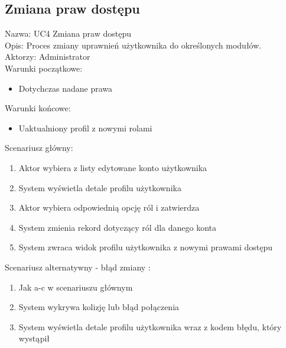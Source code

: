 \subsection{Zmiana praw dostępu}
Nazwa: UC4 Zmiana praw dostępu \\
Opis: Proces zmiany uprawnień użytkownika do określonych modułów. \\
Aktorzy: Administrator \\
Warunki początkowe:
\begin{itemize}
\item Dotychczas nadane prawa 
\end{itemize}
Warunki końcowe: 
\begin{itemize}
\item Uaktualniony profil z nowymi rolami
\end{itemize}
Scenariusz główny: 
\begin{enumerate}
\item Aktor wybiera z listy edytowane konto użytkownika
\item System wyświetla detale profilu użytkownika
\item Aktor wybiera odpowiednią opcję ról i zatwierdza
\item System zmienia rekord dotyczący ról dla danego konta
\item System zwraca widok profilu użytkownika z nowymi prawami dostępu
\end{enumerate}
Scenariusz alternatywny - błąd zmiany : 
\begin{enumerate}
\item Jak a-c w scenariuszu głównym
\item System wykrywa kolizję lub błąd połączenia
\item System wyświetla detale profilu użytkownika wraz z kodem błędu, który wystąpił
\end{enumerate}

